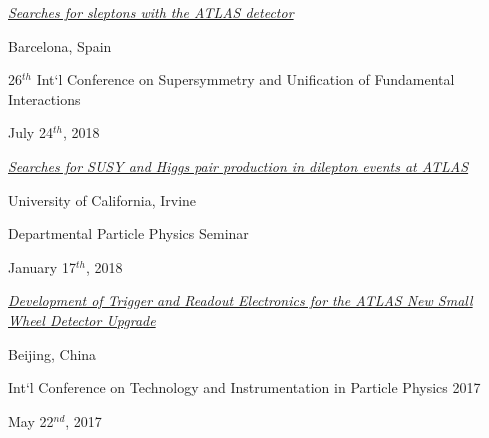 \hspace{0.25in}\begin{minipage}{0.8\textwidth}

\href{https://indico.cern.ch/event/689399/contributions/3005435/}{\textit{Searches for sleptons with the ATLAS detector}}

\vspace{0.05in}
\hspace{0.2in}
\begin{minipage}{1.0\textwidth}
Barcelona, Spain

26$^{th}$ Int`l Conference on Supersymmetry and Unification of Fundamental Interactions

July 24$^{th}$, 2018
\end{minipage}

\vspace{0.1in}
\href{https://www.physics.uci.edu/node/13108}{\textit{Searches for SUSY and Higgs pair production in dilepton events at ATLAS}}

\vspace{0.05in}
\hspace{0.2in}
\begin{minipage}{1.0\textwidth}
University of California, Irvine

Departmental Particle Physics Seminar

January 17$^{th}$, 2018
\end{minipage}

\vspace{0.1in}
\href{https://indico.ihep.ac.cn/event/6387/session/48/contribution/122}{\textit{Development of Trigger and Readout Electronics for the ATLAS New Small Wheel Detector Upgrade}}

\vspace{0.05in}
\hspace{0.2in}
\begin{minipage}{1.0\textwidth}
Beijing, China

Int`l Conference on Technology and Instrumentation in Particle Physics 2017

May 22$^{nd}$, 2017
\end{minipage}

\end{minipage}

%
%

